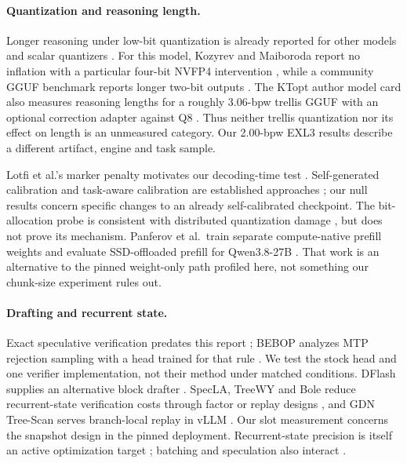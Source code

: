\documentclass[11pt]{article}
\begin{document}
\paragraph{Quantization and reasoning length.}
Longer reasoning under low-bit quantization is already reported for other
models and scalar quantizers
\citep{liu2025hurts,lian2026inflates,lotfi2026longer,alimaskina2026extreme}.
For this model, Kozyrev and Maiboroda report no inflation with a particular
four-bit NVFP4 intervention \citep{kozyrev2026gdn}, while a community GGUF
benchmark reports longer two-bit outputs \citep{migdal2026qwen38quants}.
The KTopt author model card also measures reasoning lengths for a roughly
3.06-bpw trellis GGUF with an optional correction adapter against Q8
\citep{wiklif2026ktopt}. Thus neither trellis quantization nor its effect on
length is an unmeasured category. Our 2.00-bpw EXL3 results describe a
different artifact, engine and task sample.

Lotfi et al.'s marker penalty motivates our decoding-time test
\citep{lotfi2026longer}. Self-generated calibration and task-aware
calibration are established approaches
\citep{williams2024selfcal,wang2026ayot,wang2026tasa}; our null results concern
specific changes to an already self-calibrated checkpoint. The bit-allocation
probe is consistent with distributed quantization damage
\citep{hu2026damage}, but does not prove its mechanism. Panferov et al.\ train
separate compute-native prefill weights and evaluate SSD-offloaded prefill
for Qwen3.8-27B \citep{panferov2026disaggregated}. That work is an alternative
to the pinned weight-only path profiled here, not something our chunk-size
experiment rules out.

\paragraph{Drafting and recurrent state.}
Exact speculative verification predates this report
\citep{leviathan2023fast,chen2023accelerating}; BEBOP analyzes MTP rejection
sampling with a head trained for that rule \citep{li2026bebop}. We test the
stock head and one verifier implementation, not their method under matched
conditions. DFlash supplies an alternative block drafter
\citep{chen2026dflash}. SpecLA, TreeWY and Bole reduce recurrent-state
verification costs through factor or replay designs
\citep{wang2026specla,ghantasala2026treewy,wang2026bole}, and GDN Tree-Scan
serves branch-local replay in vLLM \citep{ma2026gdntreescan}. Our slot
measurement concerns the snapshot design in the pinned deployment.
Recurrent-state precision is itself an active optimization target
\citep{zhang2026damp}; batching and speculation also interact
\citep{su2023synergy}.
\end{document}
